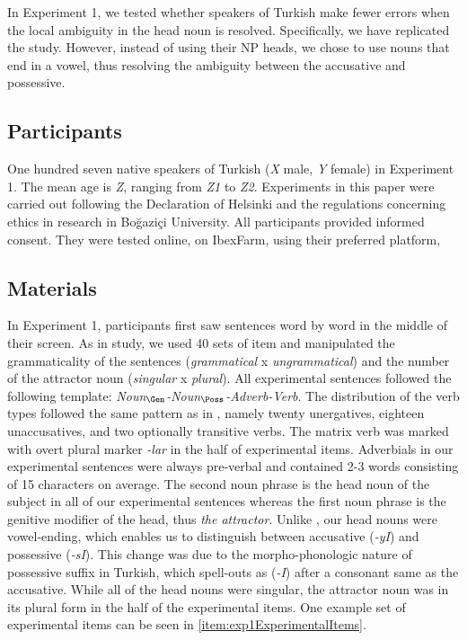 \documentclass[a4paper,man,natbib]{apa6}\usepackage[]{graphicx}\usepackage[]{color}
\begin{document}
In Experiment 1, we tested whether speakers of Turkish make fewer errors when the local ambiguity in the head noun is resolved. Specifically, we have replicated the \citet{LagoEtAl:2018} study. However, instead of using their NP heads, we chose to use nouns that end in a vowel, thus resolving the ambiguity between the accusative and possessive. 

\subsection{Participants} \label{sec:exp1:participants}

One hundred seven native speakers of Turkish (\textit{X} male, \textit{Y} female) in Experiment 1. The mean age is \textit{Z}, ranging from \textit{Z1} to \textit{Z2}. Experiments in this paper were carried out following the Declaration of Helsinki and the regulations concerning ethics in research in Bo\u{g}azi\c{c}i University. All participants provided informed consent. They were tested online, on IbexFarm, using their preferred platform, 

\subsection{Materials} \label{sec:exp1:materials}

In Experiment 1, participants first saw sentences word by word in the middle of their screen. As in \citet{LagoEtAl:2018} study, we used 40 sets of item and manipulated the grammaticality of the sentences (\textit{grammatical} x \textit{ungrammatical}) and the number of the attractor noun (\textit{singular} x \textit{plural}). All experimental sentences followed the following template: \textit{Noun$_{\Gen}$-Noun$_{\Poss}$-Adverb-Verb}. The distribution of the verb types followed the same pattern as in \citet{LagoEtAl:2018}, namely twenty unergatives, eighteen unaccusatives, and two optionally transitive verbs. The matrix verb was marked with overt plural marker \textit{-lar} in the half of experimental items. Adverbials in our experimental sentences were always pre-verbal and contained 2-3 words consisting of 15 characters on average. The second noun phrase is the head noun of the subject in all of our experimental sentences whereas the first noun phrase is the genitive modifier of the head, thus \textit{the attractor}. Unlike \citet{LagoEtAl:2018}, our head nouns were vowel-ending, which enables us to distinguish between accusative (\textit{-yI}) and possessive (\textit{-sI}). This change was due to the morpho-phonologic nature of possessive suffix in Turkish, which spell-outs as (\textit{-I}) after a consonant same as the accusative. While all of the head nouns were singular, the attractor noun was in its plural form in the half of the experimental items. One example set of experimental items can be seen in \ref{item:exp1ExperimentalItems}.
\end{document}
